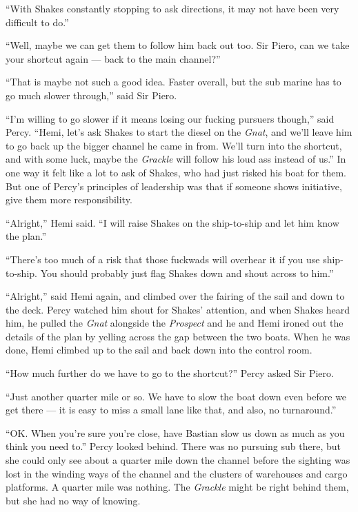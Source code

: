\documentclass[
]{scrbook}
\begin{document}
``With Shakes constantly stopping to ask directions, it may not have
been very difficult to do.''

``Well, maybe we can get them to follow him back out too. Sir Piero, can
we take your shortcut again --- back to the main channel?''

``That is maybe not such a good idea. Faster overall, but the sub marine
has to go much slower through,'' said Sir Piero.

``I'm willing to go slower if it means losing our fucking pursuers
though,'' said Percy. ``Hemi, let's ask Shakes to start the diesel on
the \emph{Gnat}, and we'll leave him to go back up the bigger channel he
came in from. We'll turn into the shortcut, and with some luck, maybe
the \emph{Grackle} will follow his loud ass instead of us.'' In one way
it felt like a lot to ask of Shakes, who had just risked his boat for
them. But one of Percy's principles of leadership was that if someone
shows initiative, give them more responsibility.

``Alright,'' Hemi said. ``I will raise Shakes on the ship-to-ship and
let him know the plan.''

``There's too much of a risk that those fuckwads will overhear it if you
use ship-to-ship. You should probably just flag Shakes down and shout
across to him.''

``Alright,'' said Hemi again, and climbed over the fairing of the sail
and down to the deck. Percy watched him shout for Shakes' attention, and
when Shakes heard him, he pulled the \emph{Gnat} alongside the
\emph{Prospect} and he and Hemi ironed out the details of the plan by
yelling across the gap between the two boats. When he was done, Hemi
climbed up to the sail and back down into the control room.

``How much further do we have to go to the shortcut?'' Percy asked Sir
Piero.

``Just another quarter mile or so. We have to slow the boat down even
before we get there --- it is easy to miss a small lane like that, and
also, no turnaround.''

``OK. When you're sure you're close, have Bastian slow us down as much
as you think you need to.'' Percy looked behind. There was no pursuing
sub there, but she could only see about a quarter mile down the channel
before the sighting was lost in the winding ways of the channel and the
clusters of warehouses and cargo platforms. A quarter mile was nothing.
The \emph{Grackle} might be right behind them, but she had no way of
knowing.
\end{document}

